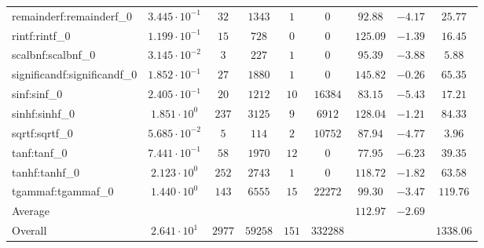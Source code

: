 \begin{tabular}{|l|c|c|c|c|c|c|c|c|}
remainderf:remainderf\_0     & $ 3.445 \cdot 10^{-1} $ & $ 32     $ & $ 1343  $ & $ 1   $ & $ 0      $ & $ 92.88       $ & $ -4.17   $ & $ 25.77   $ \\
rintf:rintf\_0               & $ 1.199 \cdot 10^{-1} $ & $ 15     $ & $ 728   $ & $ 0   $ & $ 0      $ & $ 125.09      $ & $ -1.39   $ & $ 16.45   $ \\
scalbnf:scalbnf\_0           & $ 3.145 \cdot 10^{-2} $ & $ 3      $ & $ 227   $ & $ 1   $ & $ 0      $ & $ 95.39       $ & $ -3.88   $ & $ 5.88    $ \\
significandf:significandf\_0 & $ 1.852 \cdot 10^{-1} $ & $ 27     $ & $ 1880  $ & $ 1   $ & $ 0      $ & $ 145.82      $ & $ -0.26   $ & $ 65.35   $ \\
sinf:sinf\_0                 & $ 2.405 \cdot 10^{-1} $ & $ 20     $ & $ 1212  $ & $ 10  $ & $ 16384  $ & $ 83.15       $ & $ -5.43   $ & $ 17.21   $ \\
sinhf:sinhf\_0               & $ 1.851 \cdot 10^{0}  $ & $ 237    $ & $ 3125  $ & $ 9   $ & $ 6912   $ & $ 128.04      $ & $ -1.21   $ & $ 84.33   $ \\
sqrtf:sqrtf\_0               & $ 5.685 \cdot 10^{-2} $ & $ 5      $ & $ 114   $ & $ 2   $ & $ 10752  $ & $ 87.94       $ & $ -4.77   $ & $ 3.96    $ \\
tanf:tanf\_0                 & $ 7.441 \cdot 10^{-1} $ & $ 58     $ & $ 1970  $ & $ 12  $ & $ 0      $ & $ 77.95       $ & $ -6.23   $ & $ 39.35   $ \\
tanhf:tanhf\_0               & $ 2.123 \cdot 10^{0}  $ & $ 252    $ & $ 2743  $ & $ 1   $ & $ 0      $ & $ 118.72      $ & $ -1.82   $ & $ 63.58   $ \\
tgammaf:tgammaf\_0           & $ 1.440 \cdot 10^{0}  $ & $ 143    $ & $ 6555  $ & $ 15  $ & $ 22272  $ & $ 99.30       $ & $ -3.47   $ & $ 119.76  $ \\
\hline
Average                      & $                     $ & $        $ & $       $ & $     $ & $        $ & $ 112.97      $ & $ -2.69   $ & $         $ \\
\hline
Overall                      & $ 2.641 \cdot 10^{1}  $ & $ 2977   $ & $ 59258 $ & $ 151 $ & $ 332288 $ & $             $ & $         $ & $ 1338.06 $ \\
\hline
\end{tabular}
